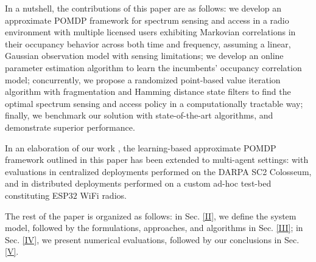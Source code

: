 \documentclass[10pt,twocolumn]{IEEEtran}
\begin{document}
 In a nutshell, the contributions of this paper are as follows: we develop an approximate POMDP framework for spectrum sensing and access in a radio environment with multiple licensed users exhibiting Markovian correlations in their occupancy behavior across both time and frequency, assuming a linear, Gaussian observation model with sensing limitations; we develop an online parameter estimation algorithm to learn the incumbents' occupancy correlation model; concurrently, we propose a randomized point-based value iteration algorithm with fragmentation and Hamming distance state filters to find the optimal spectrum sensing and access policy in a computationally tractable way; finally, we benchmark our solution with state-of-the-art algorithms, and demonstrate superior performance. 

 In an elaboration of our work \cite{TCCN:paper}, the learning-based approximate POMDP framework outlined in this paper has been extended to multi-agent settings: with evaluations in centralized deployments performed on the DARPA SC2 Colosseum, and in distributed deployments performed on a custom ad-hoc test-bed constituting ESP$32$ WiFi radios.

The rest of the paper is organized as follows: in Sec. \ref{II}, we define the system model, followed by the formulations, approaches, and algorithms in Sec. \ref{III}; in Sec. \ref{IV}, we present numerical evaluations, followed by our conclusions in Sec. \ref{V}.
\vspace{-8mm}
\end{document}
